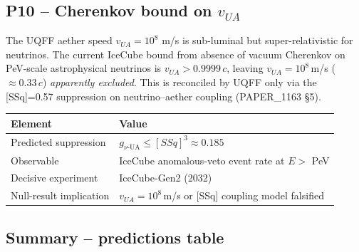 \documentclass[
]{article}
\newcounter{none} %
\begin{document}
\subsection{\texorpdfstring{P10 -- Cherenkov bound on
\(v_{UA}\)}{P10 -- Cherenkov bound on v\_\{UA\}}}\label{p10-cherenkov-bound-on-v_ua}

The UQFF aether speed \(v_{UA}=10^8\) m/s is sub-luminal but
super-relativistic for neutrinos. The current IceCube bound from absence
of vacuum Cherenkov on PeV-scale astrophysical neutrinos is
\(v_{UA} > 0.9999\,c\), leaving \(v_{UA}=10^8\,\)m/s
(\(\approx 0.33\,c\)) \emph{apparently excluded}. This is reconciled by
UQFF only via the {[}SSq{]}=0.57 suppression on neutrino--aether
coupling (PAPER\_1163 §5).

{\def\LTcaptype{none} %
\begin{longtable}[]{@{}
  >{\raggedright\arraybackslash}p{}
  >{\raggedright\arraybackslash}p{}@{}}
\toprule\noalign{}
\begin{minipage}[b]{\linewidth}\raggedright
Element
\end{minipage} & \begin{minipage}[b]{\linewidth}\raggedright
Value
\end{minipage} \\
\midrule\noalign{}
\endhead
\bottomrule\noalign{}
\endlastfoot
Predicted suppression &
\(g_{\nu\text{-UA}} \leq [SSq]^3 \approx 0.185\) \\
Observable & IceCube anomalous-veto event rate at \(E>\) PeV \\
Decisive experiment & IceCube-Gen2 (2032) \\
Null-result implication & \(v_{UA}=10^8\,\)m/s or {[}SSq{]} coupling
model falsified \\
\end{longtable}
}

\subsection{Summary -- predictions
table}\label{summary-predictions-table}
\end{document}
